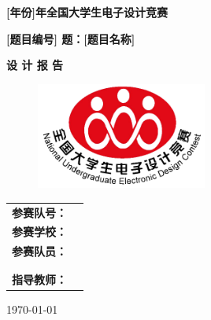\documentclass{ctexart}
\begin{document}
\begin{titlepage}
    \centering
    \vspace*{2cm}
    
    {\Huge \bfseries [年份]年全国大学生电子设计竞赛} %
    
    \vspace{2.5cm}
    
    {\huge \bfseries [题目编号] 题：[题目名称]} %
    
    \vspace{1.5cm}
    
    {\Large \bfseries 设 计 报 告}
    
    \vspace{2cm}

    \begin{figure}[H]
        \centering
        \includegraphics[width=0.5\textwidth]{../pic/电赛logo.png}
    \end{figure}

    \vspace{3cm}
    
    \begin{tabular}{ll}
        \bfseries 参赛队号： & \underline{\hspace{5cm}} \\
        \bfseries 参赛学校： & \underline{\hspace{5cm}} \\
        \bfseries 参赛队员： & \underline{\hspace{5cm}} \\
                             & \underline{\hspace{5cm}} \\
                             & \underline{\hspace{5cm}} \\
        \bfseries 指导教师： & \underline{\hspace{5cm}} \\
    \end{tabular}
    
    \vspace{1cm}
    
    {\large \today}
    
\end{titlepage}
\end{document}
